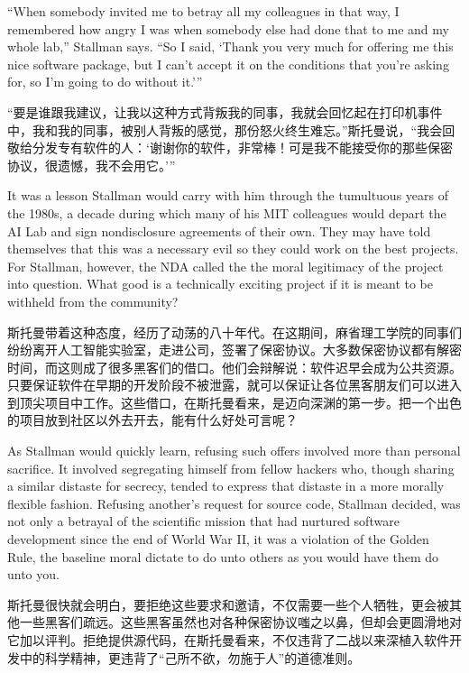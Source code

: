 \ifdefined\eng
``When somebody invited me to betray all my colleagues in that way, I remembered how angry I was when somebody else had done that to me and my whole lab,'' Stallman says. ``So I said, `Thank you very much for offering me this nice software package, but I can't accept it on the conditions that you're asking for, so I'm going to do without it.'\hspace{0.01in}''
\fi

\ifdefined\chs
“要是谁跟我建议，让我以这种方式背叛我的同事，我就会回忆起在打印机事件中，我和我的同事，被别人背叛的感觉，那份怒火终生难忘。”斯托曼说，“我会回敬给分发专有软件的人：‘谢谢你的软件，非常棒！可是我不能接受你的那些保密协议，很遗憾，我不会用它。’”
\fi

\ifdefined\eng
It was a lesson Stallman would carry with him through the tumultuous years of the 1980s, a decade during which many of his MIT colleagues would depart the AI Lab and sign nondisclosure agreements of their own. They may have told themselves that this was a necessary evil so they could work on the best projects. For Stallman, however, the NDA called the the moral legitimacy of the project into question.  What good is a technically exciting project if it is meant to be withheld from the community? 
\fi

\ifdefined\chs
斯托曼带着这种态度，经历了动荡的八十年代。在这期间，麻省理工学院的同事们纷纷离开人工智能实验室，走进公司，签署了保密协议。大多数保密协议都有解密时间，而这则成了很多黑客们的借口。他们会辩解说：软件迟早会成为公共资源。只要保证软件在早期的开发阶段不被泄露，就可以保证让各位黑客朋友们可以进入到顶尖项目中工作。这些借口，在斯托曼看来，是迈向深渊的第一步。把一个出色的项目放到社区以外去开去，能有什么好处可言呢？
\fi

\ifdefined\eng
As Stallman would quickly learn, refusing such offers involved more than personal sacrifice. It involved segregating himself from fellow hackers who, though sharing a similar distaste for secrecy, tended to express that distaste in a more morally flexible fashion. Refusing another's request for source code, Stallman decided, was not only a betrayal of the scientific mission that had nurtured software development since the end of World War II, it was a violation of the Golden Rule, the baseline moral dictate to do unto others as you would have them do unto you.
\fi

\ifdefined\chs
斯托曼很快就会明白，要拒绝这些要求和邀请，不仅需要一些个人牺牲，更会被其他一些黑客们疏远。这些黑客虽然也对各种保密协议嗤之以鼻，但却会更圆滑地对它加以评判。拒绝提供源代码，在斯托曼看来，不仅违背了二战以来深植入软件开发中的科学精神，更违背了“己所不欲，勿施于人”的道德准则。
\fi

